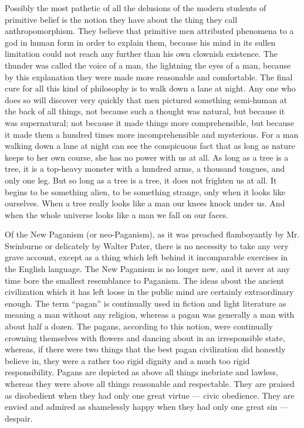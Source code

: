 Possibly the most pathetic of all the delusions of the modern students of primitive belief is the notion they have about the thing they call anthropomorphism. They believe that primitive men attributed phenomena to a god in human form in order to explain them, because his mind in its sullen limitation could not reach any further than his own clownish existence. The thunder was called the voice of a man, the lightning the eyes of a man, because by this explanation they were made more reasonable and comfortable. The final cure for all this kind of philosophy is to walk down a lane at night. Any one who does so will discover very quickly that men pictured something semi-human at the back of all things, not because such a thought was natural, but because it was supernatural; not because it made things more comprehensible, but because it made them a hundred times more incomprehensible and mysterious. For a man walking down a lane at night can see the conspicuous fact that as long as nature keeps to her own course, she has no power with us at all. As long as a tree is a tree, it is a top-heavy monster with a hundred arms, a thousand tongues, and only one leg. But so long as a tree is a tree, it does not frighten us at all. It begins to be something alien, to be something strange, only when it looks like ourselves. When a tree really looks like a man our knees knock under us. And when the whole universe looks like a man we fall on our faces.


Of the New Paganism (or neo-Paganism), as it was preached flamboyantly by Mr. Swinburne or delicately by Walter Pater, there is no necessity to take any very grave account, except as a thing which left behind it incomparable exercises in the English language. The New Paganism is no longer new, and it never at any time bore the smallest resemblance to Paganism. The ideas about the ancient civilization which it has left loose in the public mind are certainly extraordinary enough. The term “pagan” is continually used in fiction and light literature as meaning a man without any religion, whereas a pagan was generally a man with about half a dozen. The pagans, according to this notion, were continually crowning themselves with flowers and dancing about in an irresponsible state, whereas, if there were two things that the best pagan civilization did honestly believe in, they were a rather too rigid dignity and a much too rigid responsibility. Pagans are depicted as above all things inebriate and lawless, whereas they were above all things reasonable and respectable. They are praised as disobedient when they had only one great virtue — civic obedience. They are envied and admired as shamelessly happy when they had only one great sin — despair.

